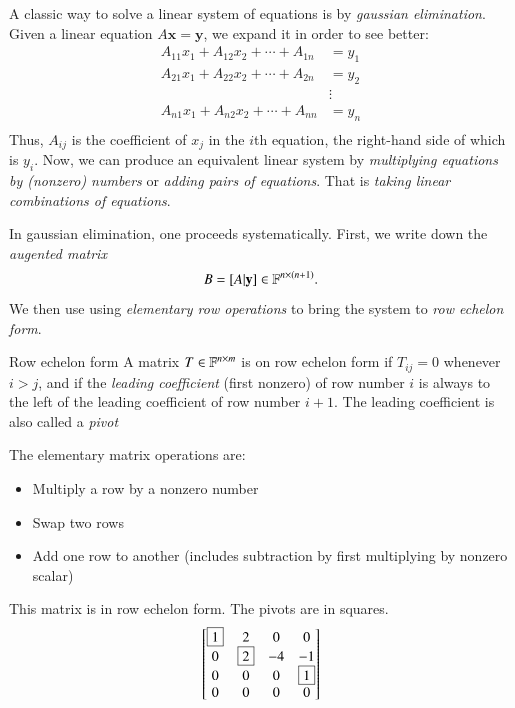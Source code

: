 A classic way to solve a linear system of equations is by \emph{gaussian elimination}. Given a linear equation $A\mathbf{x}=\mathbf{y}$, we expand it in order to see better:
\begin{align}
    A_{11} x_1 + A_{12} x_2 + \cdots + A_{1n} &= y_1 \\
    A_{21} x_1 + A_{22} x_2 + \cdots + A_{2n} &= y_2 \\
    &\vdots\\
    A_{n1} x_1 + A_{n2} x_2 + \cdots + A_{nn} &= y_n \\
\end{align}
Thus, $A_{ij}$ is the coefficient of $x_j$ in the $i$th equation, the right-hand side of which is $y_i$. Now, we can produce an equivalent linear system by \emph{multiplying equations by (nonzero) numbers} or \emph{adding pairs of equations}. That is \emph{taking linear combinations of equations}.

In gaussian elimination, one proceeds systematically. First, we write down the \emph{augented matrix}
\begin{equation}
    B = [ A | \mathbf{y} ] \in \mathbb{F}^{n\times (n + 1)}.
\end{equation}
We then use using \emph{elementary row operations} to bring the system to \emph{row echelon form}.
\begin{myDefinition}{Row echelon form}{}
    A matrix $T \in \mathbb{F}^{n\times m}$ is on row echelon form if $T_{ij}=0$ whenever $i > j$, and if the \emph{leading coefficient} (first nonzero) of row number $i$ is always to the left of the leading coefficient of row number $i+1$. The leading coefficient is also called a \emph{pivot}
\end{myDefinition}
The elementary matrix operations are:
\begin{itemize}
    \item Multiply a row by a nonzero number
    \item Swap two rows
    \item Add one row to another (includes subtraction by first multiplying by nonzero scalar)
\end{itemize}

\begin{myExample}{}{}
This matrix is in row echelon form. The pivots are in squares.
\begin{equation}
    \begin{bmatrix}
        \fbox{1} & 2 & 0 & 0 \\
        0 & \fbox{2} & -4 & -1 \\
        0 & 0 & 0 & \fbox{1} \\
        0 & 0 & 0 & 0
    \end{bmatrix}
\end{equation}
\end{myExample}

